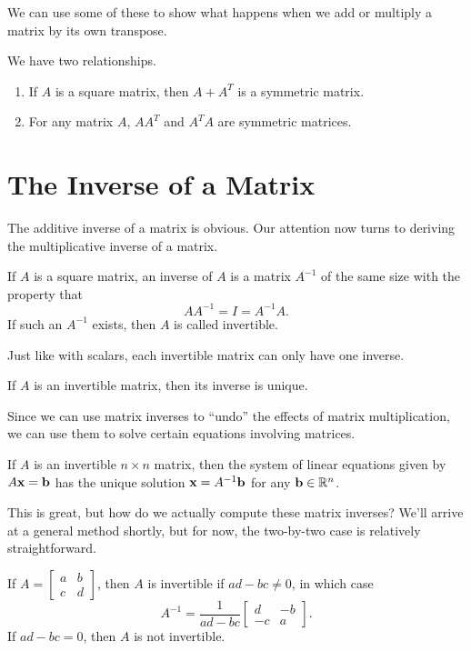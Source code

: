 \documentclass[../m073main.tex]{subfiles}
\begin{document}
We can use some of these to show what happens when we add or multiply a matrix by its own transpose.

\begin{theorem}
	We have two relationships.
	\begin{enumerate}[label=(\alph*)]
		\item If $A$ is a square matrix, then $A + A^T$ is a symmetric matrix.
		\item For any matrix $A$, $AA^T$ and $A^TA$ are symmetric matrices.
	\end{enumerate}
\end{theorem}

\section{The Inverse of a Matrix}
The additive inverse of a matrix is obvious.
Our attention now turns to deriving the multiplicative inverse of a matrix.

\begin{definition}
	If $A$ is a square matrix, an inverse of $A$ is a matrix $A^{-1}$ of the same size with the property that
	\[ A A^{-1} = I = A^{-1} A. \]
	If such an $A^{-1}$ exists, then $A$ is called invertible.
\end{definition}

Just like with scalars, each invertible matrix can only have one inverse.

\begin{theorem}
	If $A$ is an invertible matrix, then its inverse is unique.
\end{theorem}

Since we can use matrix inverses to ``undo'' the effects of matrix multiplication, we can use them to solve certain equations involving matrices.

\begin{theorem}
	If $A$ is an invertible $n\times n$ matrix, then the system of linear equations given by $A\mathbf{x} = \mathbf{b}$ has the unique solution $\mathbf{x} = A^{-1}\mathbf{b}$ for any $\mathbf{b}\in\mathbb{R}^n$.
\end{theorem}

This is great, but how do we actually compute these matrix inverses?
We'll arrive at a general method shortly, but for now, the two-by-two case is relatively straightforward.

\begin{theorem}
	If $A = \begin{bmatrix} a & b \\ c & d \end{bmatrix}$, then $A$ is invertible if $ad - bc \neq 0$, in which case
	\[ A^{-1} = \frac{1}{ad-bc} \begin{bmatrix} d & -b \\ -c & a \end{bmatrix}. \]
	If $ad-bc = 0$, then $A$ is not invertible.
\end{theorem}
\end{document}
